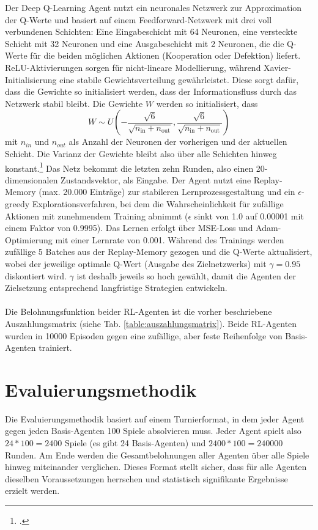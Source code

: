 Der Deep Q-Learning Agent nutzt ein neuronales Netzwerk zur Approximation der Q-Werte und basiert auf einem 
Feedforward-Netzwerk mit drei voll verbundenen Schichten: Eine Eingabeschicht mit 64 Neuronen, eine versteckte 
Schicht mit 32 Neuronen und eine Ausgabeschicht mit 2 Neuronen, die die Q-Werte für die beiden möglichen Aktionen 
(Kooperation oder Defektion) liefert. ReLU-Aktivierungen sorgen für nicht-lineare Modellierung, während Xavier-Initialisierung 
eine stabile Gewichtsverteilung gewährleistet. Diese sorgt dafür, dass die Gewichte so initialisiert werden, dass der 
Informationsfluss durch das Netzwerk stabil bleibt. Die Gewichte $W$ werden so initialisiert, dass
\begin{equation}
    W \sim U \left( -\frac{\sqrt{6}}{\sqrt{n_{\text{in}}+n_{\text{out}}}}, \frac{\sqrt{6}}{\sqrt{n_{\text{in}}+n_{\text{out}}}} \right)
\end{equation}
mit $n_{in}$ und $n_{out}$ als Anzahl der Neuronen der vorherigen und der aktuellen Schicht. Die Varianz der Gewichte bleibt
also über alle Schichten hinweg konstant.\footcite{pmlr-v9-glorot10a}
Das Netz bekommt die letzten zehn Runden, also einen 20-dimensionalen 
Zustandsvektor, als Eingabe. Der Agent nutzt eine Replay-Memory (max. 20.000 Einträge) zur stabileren 
Lernprozessgestaltung und ein $\epsilon$-greedy Explorationsverfahren, bei dem die Wahrscheinlichkeit für zufällige Aktionen mit 
zunehmendem Training abnimmt ($\epsilon$ sinkt von 1.0 auf 0.00001 mit einem Faktor von 0.9995). Das Lernen erfolgt über MSE-Loss und Adam-Optimierung mit 
einer Lernrate von 0.001.
Während des Trainings werden zufällige 5 Batches aus der Replay-Memory gezogen und die Q-Werte 
aktualisiert, wobei der jeweilige optimale Q-Wert (Ausgabe des Zielnetzwerks) mit $\gamma=0.95$ diskontiert wird. $\gamma$ ist deshalb jeweils
so hoch gewählt, damit die Agenten der Zielsetzung entsprechend langfristige Strategien entwickeln.\\ \\
Die Belohnungsfunktion beider RL-Agenten ist die vorher beschriebene Auszahlungsmatrix (siehe Tab. \ref{table:auszahlungsmatrix}).
Beide RL-Agenten wurden in 10000 Episoden gegen eine zufällige, aber feste Reihenfolge von Basis-Agenten trainiert.


\section{Evaluierungsmethodik}
Die Evaluierungsmethodik basiert auf einem Turnierformat, in dem jeder Agent gegen jeden Basis-Agenten 100 Spiele 
absolvieren muss. Jeder Agent spielt also $24 * 100 = 2400$ Spiele (es gibt 24 Basis-Agenten) und $2400 * 100 = 240000$ Runden. 
Am Ende werden die Gesamtbelohnungen aller Agenten über alle Spiele hinweg miteinander verglichen.
Dieses Format stellt sicher, dass für alle Agenten dieselben Voraussetzungen herrschen und statistisch signifikante Ergebnisse erzielt werden.
